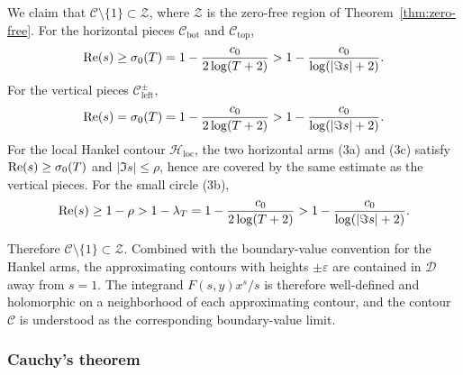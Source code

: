 We claim that $\mathcal{C} \setminus \{1\} \subset \mathcal{Z}$,
where $\mathcal{Z}$ is the zero-free region of
Theorem~\ref{thm:zero-free}. For the horizontal pieces
$\mathcal{C}_{\mathrm{bot}}$ and $\mathcal{C}_{\mathrm{top}}$,
\begin{equation}\label{eq:zfree-horizontal}
    \operatorname{Re}(s) \geq \sigma_0(T)
    = 1 - \frac{c_0}{2\log(T+2)}
    > 1 - \frac{c_0}{\log(|\Im s| + 2)}.
\end{equation}
For the vertical pieces $\mathcal{C}_{\mathrm{left}}^\pm$,
\begin{equation}\label{eq:zfree-vertical}
    \operatorname{Re}(s) = \sigma_0(T)
    = 1 - \frac{c_0}{2\log(T+2)}
    > 1 - \frac{c_0}{\log(|\Im s| + 2)}.
\end{equation}
For the local Hankel contour $\mathcal{H}_{\mathrm{loc}}$, the two
horizontal arms (3a) and (3c) satisfy $\operatorname{Re}(s) \geq \sigma_0(T)$
and $|\Im s| \leq \rho$, hence are covered by the same estimate
as the vertical pieces. For the small circle (3b),
\begin{equation}\label{eq:zfree-hankel}
    \operatorname{Re}(s) \geq 1 - \rho
    > 1 - \lambda_T
    = 1 - \frac{c_0}{2\log(T+2)}
    > 1 - \frac{c_0}{\log(|\Im s| + 2)}.
\end{equation}

Therefore $\mathcal{C} \setminus \{1\} \subset \mathcal{Z}$.
Combined with the boundary-value convention for the Hankel arms, the
approximating contours with heights $\pm\varepsilon$ are contained in
$\mathcal{D}$ away from $s=1$. The integrand $F(s, y)x^s/s$ is
therefore well-defined and holomorphic on a neighborhood of each
approximating contour, and the contour $\mathcal{C}$ is understood as
the corresponding boundary-value limit.

\subsubsection*{Cauchy's theorem}

